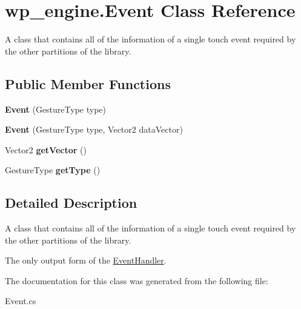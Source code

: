 \hypertarget{classwp__engine_1_1_event}{\section{wp\-\_\-engine.\-Event Class Reference}
\label{classwp__engine_1_1_event}
}


A class that contains all of the information of a single touch event required by the other partitions of the library.  


\subsection*{Public Member Functions}
\begin{DoxyCompactItemize}
\item 
\hypertarget{classwp__engine_1_1_event_a6b537a5b6162b3a6c3fbb9819c534805}{{\bfseries Event} (Gesture\-Type type)}\label{classwp__engine_1_1_event_a6b537a5b6162b3a6c3fbb9819c534805}

\item 
\hypertarget{classwp__engine_1_1_event_a34bed268174d5ca572f29b44ad2d9585}{{\bfseries Event} (Gesture\-Type type, Vector2 data\-Vector)}\label{classwp__engine_1_1_event_a34bed268174d5ca572f29b44ad2d9585}

\item 
\hypertarget{classwp__engine_1_1_event_a6a03ef6e1f7b8716d9f7a186b386904b}{Vector2 {\bfseries get\-Vector} ()}\label{classwp__engine_1_1_event_a6a03ef6e1f7b8716d9f7a186b386904b}

\item 
\hypertarget{classwp__engine_1_1_event_ad886eebf2d20a2e02f4a8642de3c8293}{Gesture\-Type {\bfseries get\-Type} ()}\label{classwp__engine_1_1_event_ad886eebf2d20a2e02f4a8642de3c8293}

\end{DoxyCompactItemize}


\subsection{Detailed Description}
A class that contains all of the information of a single touch event required by the other partitions of the library. 

The only output form of the \hyperlink{classwp__engine_1_1_event_handler}{Event\-Handler}. 

The documentation for this class was generated from the following file\-:\begin{DoxyCompactItemize}
\item 
Event.\-cs\end{DoxyCompactItemize}
